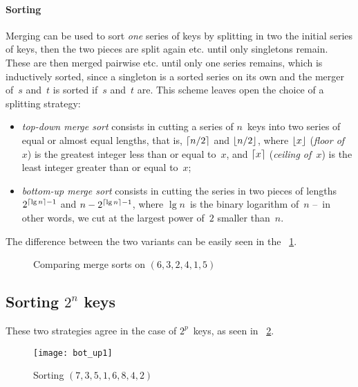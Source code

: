 \paragraph{Sorting}

Merging can be used to sort \emph{one} series of keys by splitting in
two the initial series of keys, then the two pieces are split again
etc. until only singletons remain. These are then merged pairwise
etc. until only one series remains, which is inductively sorted, since
a singleton is a sorted series on its own and the merger of~\(s\)
and~\(t\) is sorted if~\(s\) and~\(t\) are. This scheme leaves open
the choice of a splitting strategy:
\begin{itemize}

  \item \emph{top-down merge sort} consists in cutting a series of
  \(n\)~keys into two series of equal or almost equal lengths, that
  is, \(\lceil{n/2}\rceil\) and \(\lfloor{n/2}\rfloor\), where \(\lfloor{x}\rfloor\)
  (\textsl{floor of~\(x\)}) is the greatest integer less than or equal
  to~\(x\), and \(\lceil{x}\rceil\) (\textsl{ceiling of~\(x\)}) is the
  least integer greater than or equal to~\(x\);

  \item \emph{bottom-up merge sort} consists in cutting the series in
    two pieces of lengths \(2^{\lceil{\lg n}\rceil-1}\) and
    \(n-2^{\lceil{\lg n}\rceil-1}\), where \(\lg n\)~is the binary
    logarithm of~\(n\) --~in other words, we cut at the largest power
    of~\(2\) smaller than~\(n\).

\end{itemize}
The difference between the two variants can be easily seen in the
\fig~\ref{fig:comp}.
\begin{figure}
\centering
{}
\qquad
{}
\caption{Comparing merge sorts on \((6,3,2,4,1,5)\)\label{fig:comp}}
\end{figure}

\subsection{Sorting $2^n$ keys}

These two strategies agree in the case of \(2^p\)~keys, as seen in
\fig~\ref{fig:bot_up1}.
\begin{figure}[b]
\centering
\texttt{[image: bot\_up1]}
\caption{Sorting \((7,3,5,1,6,8,4,2)\)
\label{fig:bot_up1}}
\end{figure}

